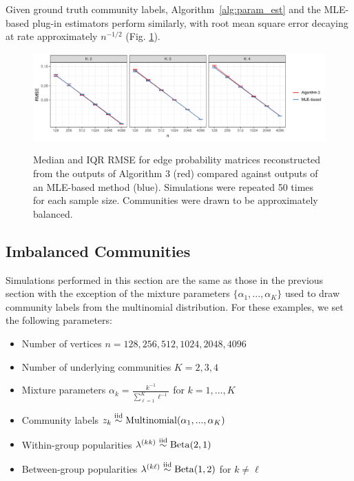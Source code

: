 \documentclass[12pt]{article}
\providecommand{\tightlist}{%
  \setlength{\itemsep}{0pt}\setlength{\parskip}{0pt}}
\begin{document}
Given ground truth community labels, Algorithm~\ref{alg:param_est} and the MLE-based
plug-in estimators perform similarly, with root mean square
error decaying at rate approximately \(n^{-1/2}\) (Fig. \ref{fig:p_block_est}). 

\begin{figure}[H]
{\centering \includegraphics{summary_files/figure-latex/lambda_est_p-1}}
\caption{Median and IQR RMSE for edge probability matrices reconstructed from the outputs of Algorithm 3 (red) compared against outputs of an MLE-based method (blue). Simulations were repeated 50 times for each sample size. Communities were drawn to be approximately balanced.}
\label{fig:p_block_est}
\end{figure}

\hypertarget{imbalanced-communities}{%
\subsection{Imbalanced Communities}\label{imbalanced-communities}}

Simulations performed in this section are the same as those in the
previous section with the exception of the mixture parameters
\(\{\alpha_1, ..., \alpha_K\}\) used to draw community labels from the
multinomial distribution. For these examples, we set the following
parameters:

\begin{itemize}
\tightlist
\item
  Number of vertices \(n = 128, 256, 512, 1024, 2048, 4096\)
\item
  Number of underlying communities \(K = 2, 3, 4\)
\item
  Mixture parameters \(\alpha_k = \frac{k^{-1}}{\sum_{\ell=1}^K \ell^{-1}}\)
  for \(k = 1, ..., K\)
\item
  Community labels
  \(z_k \stackrel{\text{iid}}{\sim} \mathrm{Multinomial}(\alpha_1, ..., \alpha_K)\)
\item
  Within-group popularities
  \(\lambda^{(kk)} \stackrel{\text{iid}}{\sim} \mathrm{Beta}(2, 1)\)
\item
  Between-group popularities
  \(\lambda^{(k \ell)} \stackrel{\text{iid}}{\sim} \mathrm{Beta}(1, 2)\) for
  \(k \neq \ell\)
\end{itemize}
\end{document}
